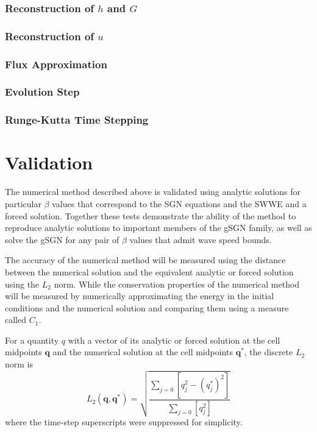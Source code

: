 \documentclass[10pt]{elsarticle}
\newcommand{\vecn}[1]{\boldsymbol{#1}}
\begin{document}
\subsubsection{Reconstruction of $h$ and $G$}

\subsubsection{Reconstruction of $u$}

\subsubsection{Flux Approximation}

\subsubsection{Evolution Step}

\subsubsection{Runge-Kutta Time Stepping}



\section{Validation}
The numerical method described above is validated using analytic solutions for particular $\beta$ values that correspond to the SGN equations and the SWWE and a forced solution. Together these tests demonstrate the ability of the method to reproduce analytic solutions to important members of the gSGN family, as well as solve the gSGN for any pair of $\beta$ values that admit wave speed bounds.

The accuracy of the numerical method will be measured using the distance between the numerical solution and the equivalent analytic or forced solution using the $L_2$ norm. While the conservation properties of the numerical method will be measured by numerically approximating the energy in the initial conditions and the numerical solution and comparing them using a measure called $C_1$.

For a quantity $q$ with a vector of its analytic or forced solution at the cell midpoints $\vecn{q}$ and the numerical solution at the cell midpoints $\vecn{q}^*$, the discrete $L_2$ norm is
\begin{equation}
\label{eqn:Conv_Error}
L_2\left(\vecn{q},\vecn{q}^*\right) = \sqrt{ \dfrac{\sum_{j = 0}  \left[q_j^2 - \left(q^*_j\right)^2 \right]}{\sum_{j = 0}  \left[q_j^2 \right]}}
\end{equation}
where the time-step superscripts were suppressed for simplicity.
\end{document}
